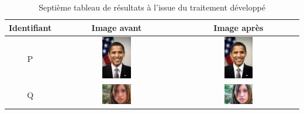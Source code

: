 \documentclass[11pt, french,screen]{report-rd-info}
\begin{document}
\begin{table}
\centering
\begin{tabular}{|c|c|c|}	
   \hline \textbf{Identifiant}  &  \textbf{Image avant}  &  \textbf{Image après} \\ \hline 
   P & \includegraphics[width=0.25\textwidth]{Resultats/pp_avant} & \includegraphics[width=0.25\textwidth]{Resultats/pp_apres} \\ \hline      
   Q & \includegraphics[width=0.25\textwidth]{Resultats/pq_avant} & \includegraphics[width=0.25\textwidth]{Resultats/pq_apres} \\ \hline
\end{tabular}
\caption{Septième tableau de résultats à l'issue du traitement développé}
\label{tab:Resultats7}
\end{table}
\end{document}
